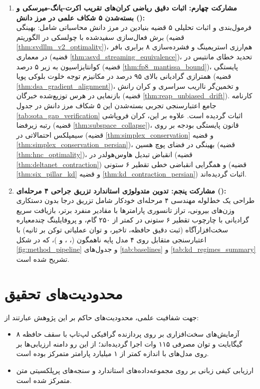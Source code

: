 \documentclass[12pt,a4paper]{report}
\theoremstyle{definition}
\begin{document}
\begin{enumerate}
    \item \textbf{مشارکت چهارم: اثبات دقیق ریاضی کران‌های تقریب اکرت-یانگ-میرسکی و بسته‌شدن ۵ شکاف علمی در مرز دانش ():} \\
    فرمول‌بندی و اثبات تحلیلی ۵ قضیه بنیادین در مرز دانش محاسباتی شامل: بهینگی برش فعال‌سازی سفیدشده با چولسکی در الگوریتم  (قضیه \ref{thm:svdllm_v2_optimality})، هم‌ارزی استریمینگ و فشرده‌سازی ۸ برابری بافر  در معماری  (قضیه \ref{thm:asvd_streaming_equivalence})، تحدید خطای مانتیس در کوانتایزاسیون  به زیر ۵ درصد (قضیه \ref{thm:fp8_mantissa_bound})، پایستگی همترازی گرادیانی بالای ۹۵ درصد در مکانیزم توجه خلوت بلوکی پویا  (قضیه \ref{thm:dsa_gradient_alignment})، و تخمین‌گر نااریب سراسری و کران رانش بازنمایی در هرس توزیع‌شده خبرگان  (قضیه \ref{thm:reap_unbiased_drift}). کارنامه جامع اعتبارسنجی تجربی بسته‌شدن این ۵ شکاف مرز دانش در جدول \ref{tab:sota_gap_verification} اثبات گردیده است. علاوه بر این، کران فروپاشی رتبه زیرفضا (قضیه \ref{thm:subspace_collapse})، قانون پایستگی بودجه بر روی سیمپلکس احتمالاتی در  (قضیه \ref{thm:simplex_conservation} و قضیه \ref{thm:simplex_conservation_persian})، بهینگی در فضای پوچ هسین (قضیه \ref{thm:hnc_optimality})، انقباض تبدیل هاوس‌هولدر در  (قضیه \ref{thm:deltanet_contraction}) و همگرایی انقباضی خطی تقطیر ۶ ستونی (قضیه \ref{thm:six_pillar_kd} و قضیه \ref{thm:kd_contraction_persian}) اثبات گردیده‌اند.

    \item \textbf{مشارکت پنجم: تدوین متدولوژی استاندارد تزریق جراحی ۴ مرحله‌ای ():} \\
    طراحی یک خط‌لوله مهندسی ۴ مرحله‌ای خودکار شامل تزریق درجا  بدون دستکاری وزن‌های بیرونی، تراز تانسوری پارامترها با مقادیر منفرد برتر، بازیافت سریع گرادیانی با چارچوب تقطیر ۶ ستونی در کمتر از ۲۵۰ گام، و پروفایلینگ چندمعیاره سخت‌افزارآگاه (ثبت دقیق حافظه، تاخیر، و توان عملیاتی توکن بر ثانیه) با اعتبارسنجی متقابل روی ۴ مدل پایه ناهمگون (، ،  و )، که در شکل \ref{fig:method_pipeline} و جدول‌های \ref{tab:baselines} و \ref{tab:kd_regimes_summary} تشریح شده است.
\end{enumerate}

\section{محدودیت‌های تحقیق}
جهت شفافیت علمی، محدودیت‌های حاکم بر این پژوهش عبارتند از:
\begin{itemize}
    \item آزمایش‌های سخت‌افزاری بر روی پردازنده گرافیکی لپ‌تاپ  با سقف حافظه ۸ گیگابایت  و توان مصرفی ۱۱۵ وات اجرا گردیده‌اند؛ از این رو دامنه ارزیابی‌ها بر روی مدل‌های با اندازه کمتر از ۱ میلیارد پارامتر متمرکز بوده است.
    \item ارزیابی کیفی زبانی بر روی مجموعه‌داده‌های استاندارد  و سنجه‌های پرپلکسیتی متن متمرکز شده است.
\end{itemize}
\end{document}
